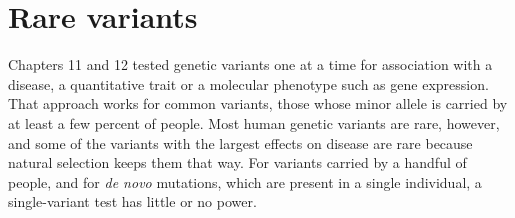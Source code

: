 
\providecommand{\R}{\mathbb{R}}
\providecommand{\E}{\mathbb{E}}
\providecommand{\Normal}{\mathcal{N}}
\providecommand{\argmax}{\operatorname*{arg\,max}}
\providecommand{\argmin}{\operatorname*{arg\,min}}
\providecommand{\vy}{\mathbf{y}}
\providecommand{\vx}{\mathbf{x}}
\providecommand{\mX}{\mathbf{X}}
\providecommand{\mI}{\mathbf{I}}
\providecommand{\vb}{\boldsymbol{\beta}}
\providecommand{\veps}{\boldsymbol{\epsilon}}
\providecommand{\vp}{\mathbf{p}}
\providecommand{\vg}{\mathbf{g}}
\providecommand{\ind}{\mathbf{1}}
\providecommand{\valpha}{\boldsymbol{\alpha}}
\providecommand{\vz}{\mathbf{z}}
\providecommand{\va}{\mathbf{a}}
\providecommand{\vr}{\mathbf{r}}
\providecommand{\vmu}{\boldsymbol{\mu}}
\providecommand{\vphi}{\boldsymbol{\phi}}
\providecommand{\vw}{\mathbf{w}}
\providecommand{\vd}{\mathbf{d}}
\providecommand{\vc}{\mathbf{c}}
\providecommand{\vS}{\mathbf{S}}
\providecommand{\mG}{\mathbf{G}}
\providecommand{\mK}{\mathbf{K}}
\providecommand{\mW}{\mathbf{W}}
\providecommand{\mR}{\mathbf{R}}
\providecommand{\mP}{\mathbf{P}}
\providecommand{\mD}{\mathbf{D}}
\providecommand{\mV}{\mathbf{V}}
\providecommand{\mSigma}{\boldsymbol{\Sigma}}
\providecommand{\Var}{\operatorname{Var}}
\providecommand{\Cov}{\operatorname{Cov}}
\providecommand{\tr}{\operatorname{tr}}
\providecommand{\Bin}{\operatorname{Binomial}}
\providecommand{\BetaD}{\operatorname{Beta}}
\providecommand{\Pois}{\operatorname{Poisson}}

\providecommand{\chaptertoc}{}
\chapter{Rare variants}
\label{ch:rare_variants}
\chaptertoc

Chapters 11 and 12 tested genetic variants one at a time for association with a disease, a quantitative trait or a molecular phenotype such as gene expression. That approach works for common variants, those whose minor allele is carried by at least a few percent of people. Most human genetic variants are rare, however, and some of the variants with the largest effects on disease are rare because natural selection keeps them that way. For variants carried by a handful of people, and for \emph{de novo} mutations, which are present in a single individual, a single-variant test has little or no power.

